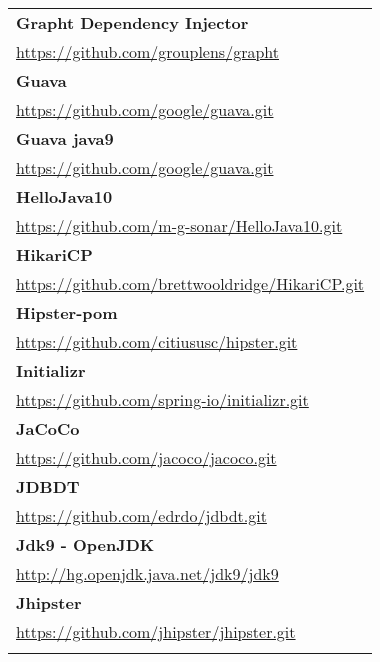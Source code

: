 \begin{table}[]
\small
\begin{tabular}{|p{130mm}|}
\hline 
\bf Grapht Dependency Injector                         \\ \url{https://github.com/grouplens/grapht}                                          \\ \hline \bf
Guava                                              \\ \url{https://github.com/google/guava.git}                                          \\ \hline \bf
Guava java9                                       \\ \url{https://github.com/google/guava.git}                                          \\ \hline \bf
HelloJava10                                        \\ \url{https://github.com/m-g-sonar/HelloJava10.git}                                 \\ \hline \bf
HikariCP                                           \\ \url{https://github.com/brettwooldridge/HikariCP.git}                              \\ \hline \bf
Hipster-pom                                        \\ \url{https://github.com/citiususc/hipster.git}                                     \\ \hline \bf
Initializr                                         \\ \url{https://github.com/spring-io/initializr.git}                                  \\ \hline \bf
JaCoCo                                             \\ \url{https://github.com/jacoco/jacoco.git}                                         \\ \hline \bf
JDBDT                                              \\ \url{https://github.com/edrdo/jdbdt.git}                                           \\ \hline \bf
Jdk9 - OpenJDK                                               \\ \url{http://hg.openjdk.java.net/jdk9/jdk9}                                         \\ \hline \bf
Jhipster                                           \\ \url{https://github.com/jhipster/jhipster.git}                                     \\ \hline \bf

\end{tabular}
\end{table}
